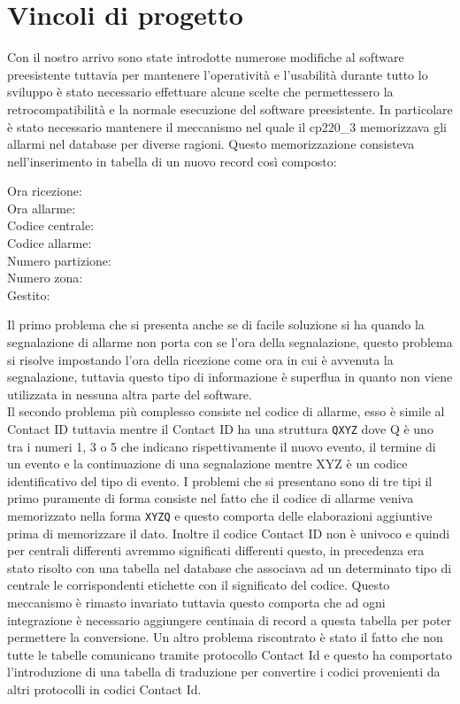 \section{Vincoli di progetto}
Con il nostro arrivo sono state introdotte numerose modifiche al software preesistente tuttavia per mantenere l'operatività e l'usabilità durante tutto lo sviluppo è stato necessario effettuare alcune scelte che permettessero la retrocompatibilità e la normale esecuzione del software preesistente. In particolare è stato necessario mantenere il meccanismo nel quale il cp220\_3 memorizzava gli allarmi nel database per diverse ragioni. Questo memorizzazione consisteva nell'inserimento in tabella di un nuovo record così composto:
\begin{description}
	\item[Ora ricezione:]
	\item[Ora allarme:]
	\item[Codice centrale:]
	\item[Codice allarme:]
	\item[Numero partizione:]
	\item[Numero zona:]
	\item[Gestito:]
\end{description}
Il primo problema che si presenta anche se di facile soluzione si ha quando la segnalazione di allarme non porta con se l'ora della segnalazione, questo problema si risolve impostando l'ora della ricezione come ora in cui è avvenuta la segnalazione, tuttavia questo tipo di informazione è superflua in quanto non viene utilizzata in nessuna altra parte del software.\\
Il secondo problema più complesso consiste nel codice di allarme, esso è simile al Contact ID tuttavia mentre il Contact ID ha una struttura \texttt{QXYZ} dove Q è uno tra i numeri 1, 3 o 5 che indicano rispettivamente il nuovo evento, il termine di un evento e la continuazione di una segnalazione mentre XYZ è un codice identificativo del tipo di evento. I problemi che si presentano sono di tre tipi il primo puramente di forma consiste nel fatto che il codice di allarme veniva memorizzato nella forma \texttt{XYZQ} e questo comporta delle elaborazioni aggiuntive prima di memorizzare il dato. Inoltre il codice Contact ID non è univoco e quindi per centrali differenti avremmo significati differenti questo, in precedenza era stato risolto con una tabella nel database che associava ad un determinato tipo di centrale le corrispondenti etichette con il significato del codice. Questo meccanismo è rimasto invariato tuttavia questo comporta che ad ogni integrazione è necessario aggiungere centinaia di record a questa tabella per poter permettere la conversione. Un altro problema riscontrato è stato il fatto che non tutte le tabelle comunicano tramite protocollo Contact Id e questo ha comportato l'introduzione di una tabella di traduzione per convertire i codici provenienti da altri protocolli in codici Contact Id.\\
